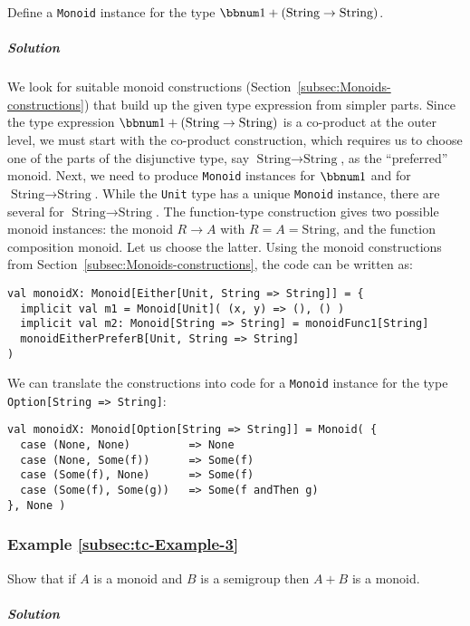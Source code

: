 Define a \lstinline!Monoid! instance for the type $\bbnum 1+(\text{String}\rightarrow\text{String})$.

\subparagraph{Solution}

We look for suitable monoid constructions (Section~\ref{subsec:Monoids-constructions})
that build up the given type expression from simpler parts. Since
the type expression $\bbnum 1+(\text{String}\rightarrow\text{String})$
is a co-product at the outer level, we must start with the co-product
construction, which requires us to choose one of the parts of the
disjunctive type, say $\text{String}\rightarrow\text{String}$, as
the \textsf{``}preferred\textsf{''} monoid. Next, we need to produce \lstinline!Monoid!
instances for $\bbnum 1$ and for $\text{String}\rightarrow\text{String}$.
While the \lstinline!Unit! type has a unique \lstinline!Monoid!
instance, there are several for $\text{String}\rightarrow\text{String}$.
The function-type construction gives two possible monoid instances:
the monoid $R\rightarrow A$ with $R=A=\text{String}$, and the function
composition monoid. Let us choose the latter. Using the monoid constructions
from Section~\ref{subsec:Monoids-constructions}, the code can be
written as:
\begin{lstlisting}
val monoidX: Monoid[Either[Unit, String => String]] = {
  implicit val m1 = Monoid[Unit]( (x, y) => (), () )
  implicit val m2: Monoid[String => String] = monoidFunc1[String]
  monoidEitherPreferB[Unit, String => String]
)
\end{lstlisting}
We can translate the constructions into code for a \lstinline!Monoid!
instance for the type \lstinline!Option[String => String]!:
\begin{lstlisting}
val monoidX: Monoid[Option[String => String]] = Monoid( {
  case (None, None)         => None
  case (None, Some(f))      => Some(f)
  case (Some(f), None)      => Some(f)
  case (Some(f), Some(g))   => Some(f andThen g)
}, None )
\end{lstlisting}


\subsubsection{Example \label{subsec:tc-Example-3}\ref{subsec:tc-Example-3}}

Show that if $A$ is a monoid and $B$ is a semigroup then $A+B$
is a monoid.

\subparagraph{Solution}

